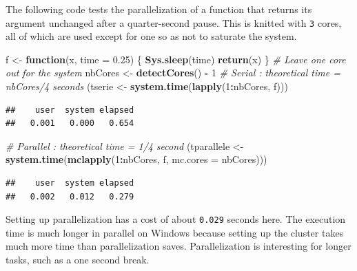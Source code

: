 \documentclass[
  12pt,
  american,
  a4paper,
  extrafontsizes,onecolumn,openright
  ]{memoir}
\newenvironment{Shaded}{\begin{snugshade}}{\end{snugshade}}
\newcommand{\AttributeTok}[1]{\textcolor[rgb]{0.13,0.29,0.53}{#1}}
\newcommand{\CommentTok}[1]{\textcolor[rgb]{0.56,0.35,0.01}{\textit{#1}}}
\newcommand{\ControlFlowTok}[1]{\textcolor[rgb]{0.13,0.29,0.53}{\textbf{#1}}}
\newcommand{\DecValTok}[1]{\textcolor[rgb]{0.00,0.00,0.81}{#1}}
\newcommand{\FloatTok}[1]{\textcolor[rgb]{0.00,0.00,0.81}{#1}}
\newcommand{\FunctionTok}[1]{\textcolor[rgb]{0.13,0.29,0.53}{\textbf{#1}}}
\newcommand{\NormalTok}[1]{#1}
\newcommand{\OtherTok}[1]{\textcolor[rgb]{0.56,0.35,0.01}{#1}}
\newcommand{\SpecialCharTok}[1]{\textcolor[rgb]{0.81,0.36,0.00}{\textbf{#1}}}
\begin{document}
\normalsize

The following code tests the parallelization of a function that returns its argument unchanged after a quarter-second pause.
This is knitted with \texttt{3} cores, all of which are used except for one so as not to saturate the system.

\scriptsize

\begin{Shaded}
\begin{Highlighting}[]
\NormalTok{f }\OtherTok{\textless{}{-}} \ControlFlowTok{function}\NormalTok{(x, }\AttributeTok{time =} \FloatTok{0.25}\NormalTok{) \{}
    \FunctionTok{Sys.sleep}\NormalTok{(time)}
    \FunctionTok{return}\NormalTok{(x)}
\NormalTok{\}}
\CommentTok{\# Leave one core out for the system}
\NormalTok{nbCores }\OtherTok{\textless{}{-}} \FunctionTok{detectCores}\NormalTok{() }\SpecialCharTok{{-}} \DecValTok{1}
\CommentTok{\# Serial : theoretical time = nbCores/4 seconds}
\NormalTok{(tserie }\OtherTok{\textless{}{-}} \FunctionTok{system.time}\NormalTok{(}\FunctionTok{lapply}\NormalTok{(}\DecValTok{1}\SpecialCharTok{:}\NormalTok{nbCores, f)))}
\end{Highlighting}
\end{Shaded}

\begin{verbatim}
##    user  system elapsed 
##   0.001   0.000   0.654
\end{verbatim}

\begin{Shaded}
\begin{Highlighting}[]
\CommentTok{\# Parallel : theoretical time = 1/4 second}
\NormalTok{(tparallele }\OtherTok{\textless{}{-}} \FunctionTok{system.time}\NormalTok{(}\FunctionTok{mclapply}\NormalTok{(}\DecValTok{1}\SpecialCharTok{:}\NormalTok{nbCores, f, }\AttributeTok{mc.cores =}\NormalTok{ nbCores)))}
\end{Highlighting}
\end{Shaded}

\begin{verbatim}
##    user  system elapsed 
##   0.002   0.012   0.279
\end{verbatim}

\normalsize

Setting up parallelization has a cost of about \texttt{0.029} seconds here.
The execution time is much longer in parallel on Windows because setting up the cluster takes much more time than parallelization saves.
Parallelization is interesting for longer tasks, such as a one second break.
\end{document}

